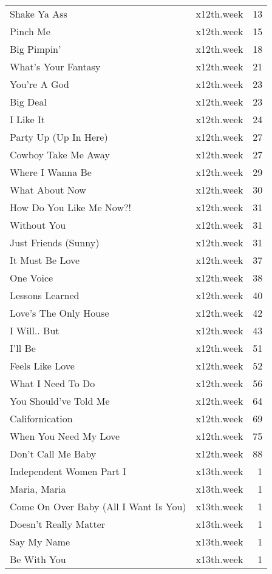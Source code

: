 \begin{table}[ht]
\begin{tabular}{llr}
  Shake Ya Ass & x12th.week &  13 \\ 
  Pinch Me & x12th.week &  15 \\ 
  Big Pimpin' & x12th.week &  18 \\ 
  What's Your Fantasy & x12th.week &  21 \\ 
  You're A God & x12th.week &  23 \\ 
  Big Deal & x12th.week &  23 \\ 
  I Like It & x12th.week &  24 \\ 
  Party Up (Up In Here) & x12th.week &  27 \\ 
  Cowboy Take Me Away & x12th.week &  27 \\ 
  Where I Wanna Be & x12th.week &  29 \\ 
  What About Now & x12th.week &  30 \\ 
  How Do You Like Me Now?! & x12th.week &  31 \\ 
  Without You & x12th.week &  31 \\ 
  Just Friends (Sunny) & x12th.week &  31 \\ 
  It Must Be Love & x12th.week &  37 \\ 
  One Voice & x12th.week &  38 \\ 
  Lessons Learned & x12th.week &  40 \\ 
  Love's The Only House & x12th.week &  42 \\ 
  I Will.. But & x12th.week &  43 \\ 
  I'll Be & x12th.week &  51 \\ 
  Feels Like Love & x12th.week &  52 \\ 
  What I Need To Do & x12th.week &  56 \\ 
  You Should've Told Me & x12th.week &  64 \\ 
  Californication & x12th.week &  69 \\ 
  When You Need My Love & x12th.week &  75 \\ 
  Don't Call Me Baby & x12th.week &  88 \\ 
  Independent Women Part I & x13th.week &   1 \\ 
  Maria, Maria & x13th.week &   1 \\ 
  Come On Over Baby (All I Want Is You) & x13th.week &   1 \\ 
  Doesn't Really Matter & x13th.week &   1 \\ 
  Say My Name & x13th.week &   1 \\ 
  Be With You & x13th.week &   1 \\ 

\end{tabular}
\end{table}
